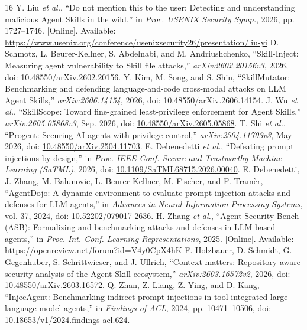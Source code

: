 \begin{thebibliography}{16}
 Y. Liu \emph{et al.}, ``Do not mention this to the user: Detecting and understanding malicious Agent Skills in the wild,'' in \emph{Proc. USENIX Security Symp.}, 2026, pp. 1727--1746. [Online]. Available: \url{https://www.usenix.org/conference/usenixsecurity26/presentation/liu-yi}
 D. Schmotz, L. Beurer-Kellner, S. Abdelnabi, and M. Andriushchenko, ``Skill-Inject: Measuring agent vulnerability to Skill file attacks,'' \emph{arXiv:2602.20156v3}, 2026, doi: \href{https://doi.org/10.48550/arXiv.2602.20156}{10.48550/arXiv.2602.20156}.
 Y. Kim, M. Song, and S. Shin, ``SkillMutator: Benchmarking and defending language-and-code cross-modal attacks on LLM Agent Skills,'' \emph{arXiv:2606.14154}, 2026, doi: \href{https://doi.org/10.48550/arXiv.2606.14154}{10.48550/arXiv.2606.14154}.
 J. Wu \emph{et al.}, ``SkillScope: Toward fine-grained least-privilege enforcement for Agent Skills,'' \emph{arXiv:2605.05868v3}, Sep. 2026, doi: \href{https://doi.org/10.48550/arXiv.2605.05868}{10.48550/arXiv.2605.05868}.
 T. Shi \emph{et al.}, ``Progent: Securing AI agents with privilege control,'' \emph{arXiv:2504.11703v3}, May 2026, doi: \href{https://doi.org/10.48550/arXiv.2504.11703}{10.48550/arXiv.2504.11703}.
 E. Debenedetti \emph{et al.}, ``Defeating prompt injections by design,'' in \emph{Proc. IEEE Conf. Secure and Trustworthy Machine Learning (SaTML)}, 2026, doi: \href{https://doi.org/10.1109/SaTML68715.2026.00040}{10.1109/SaTML68715.2026.00040}.
 E. Debenedetti, J. Zhang, M. Balunovic, L. Beurer-Kellner, M. Fischer, and F. Tram\`er, ``AgentDojo: A dynamic environment to evaluate prompt injection attacks and defenses for LLM agents,'' in \emph{Advances in Neural Information Processing Systems}, vol. 37, 2024, doi: \href{https://doi.org/10.52202/079017-2636}{10.52202/079017-2636}.
 H. Zhang \emph{et al.}, ``Agent Security Bench (ASB): Formalizing and benchmarking attacks and defenses in LLM-based agents,'' in \emph{Proc. Int. Conf. Learning Representations}, 2025. [Online]. Available: \url{https://openreview.net/forum?id=V4y0CpX4hK}
 F. Holzbauer, D. Schmidt, G. Gegenhuber, S. Schrittwieser, and J. Ullrich, ``Context matters: Repository-aware security analysis of the Agent Skill ecosystem,'' \emph{arXiv:2603.16572v2}, 2026, doi: \href{https://doi.org/10.48550/arXiv.2603.16572}{10.48550/arXiv.2603.16572}.
 Q. Zhan, Z. Liang, Z. Ying, and D. Kang, ``InjecAgent: Benchmarking indirect prompt injections in tool-integrated large language model agents,'' in \emph{Findings of ACL}, 2024, pp. 10471--10506, doi: \href{https://doi.org/10.18653/v1/2024.findings-acl.624}{10.18653/v1/2024.findings-acl.624}.

\end{thebibliography}

